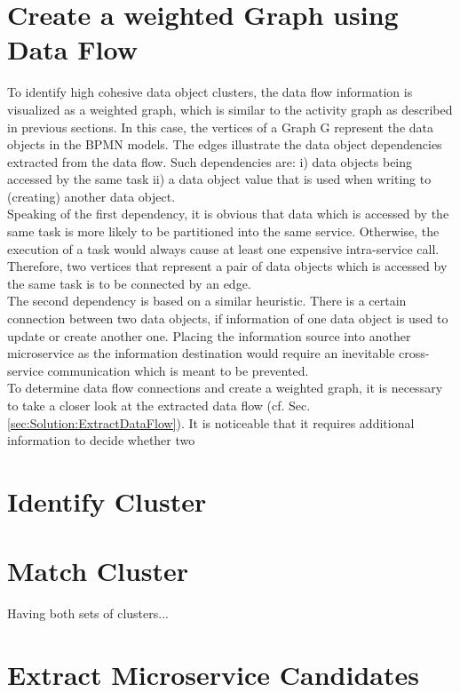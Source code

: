 \section{Create a weighted Graph using Data Flow}
\label{sec:Solution:CreateGraphData}
To identify high cohesive data object clusters, the data flow information is visualized as a weighted graph, which is similar to the activity graph as described in previous sections. In this case, the vertices of a Graph G represent the data objects in the BPMN models. The edges illustrate the data object dependencies extracted from the data flow.
Such dependencies are: i) data objects being accessed by the same task ii) a data object value that is used when writing to (creating) another data object. \\
Speaking of the first dependency, it is obvious that data which is accessed by the same task is more likely to be partitioned into the same service. Otherwise, the execution of a task would always cause at least one expensive intra-service call.
Therefore, two vertices that represent a pair of data objects which is accessed by the same task is to be connected by an edge. \\
The second dependency is based on a similar heuristic. There is a certain connection between two data objects, if information of one data object is used to update or create another one. Placing the information source into another microservice as the information destination would require an inevitable cross-service communication which is meant to be prevented. \\
To determine data flow connections and create a weighted graph, it is necessary to take a closer look at the extracted data flow (cf. Sec.\ref{sec:Solution:ExtractDataFlow}). It is noticeable that it requires additional information to decide whether two 


\section{Identify Cluster}
\label{sec:Solution:IdentifyCluster}

\section{Match Cluster}
\label{sec:Solution:MatchCluster}
Having both sets of clusters...

\section{Extract Microservice Candidates}
\label{sec:Solution:ExtractMicroserviceCandidates}




